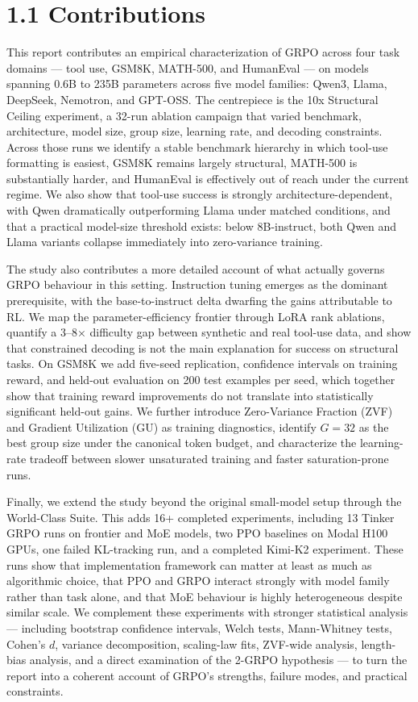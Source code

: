 \documentclass[
  american,
  11pt,
  a4paper,
  oneside]{report}
\begin{document}
\section{1.1 Contributions}\label{contributions}

This report contributes an empirical characterization of GRPO across
four task domains --- tool use, GSM8K, MATH-500, and HumanEval --- on
models spanning 0.6B to 235B parameters across five model families:
Qwen3, Llama, DeepSeek, Nemotron, and GPT-OSS. The centrepiece is the
10x Structural Ceiling experiment, a 32-run ablation campaign that
varied benchmark, architecture, model size, group size, learning rate,
and decoding constraints. Across those runs we identify a stable
benchmark hierarchy in which tool-use formatting is easiest, GSM8K
remains largely structural, MATH-500 is substantially harder, and
HumanEval is effectively out of reach under the current regime. We also
show that tool-use success is strongly architecture-dependent, with Qwen
dramatically outperforming Llama under matched conditions, and that a
practical model-size threshold exists: below 8B-instruct, both Qwen and
Llama variants collapse immediately into zero-variance training.

The study also contributes a more detailed account of what actually
governs GRPO behaviour in this setting. Instruction tuning emerges as
the dominant prerequisite, with the base-to-instruct delta dwarfing the
gains attributable to RL. We map the parameter-efficiency frontier
through LoRA rank ablations, quantify a 3--8× difficulty gap between
synthetic and real tool-use data, and show that constrained decoding is
not the main explanation for success on structural tasks. On GSM8K we
add five-seed replication, confidence intervals on training reward, and
held-out evaluation on 200 test examples per seed, which together show
that training reward improvements do not translate into statistically
significant held-out gains. We further introduce Zero-Variance Fraction
(ZVF) and Gradient Utilization (GU) as training diagnostics, identify
\(G{=}32\) as the best group size under the canonical token budget, and
characterize the learning-rate tradeoff between slower unsaturated
training and faster saturation-prone runs.

Finally, we extend the study beyond the original small-model setup
through the World-Class Suite. This adds 16+ completed experiments,
including 13 Tinker GRPO runs on frontier and MoE models, two PPO
baselines on Modal H100 GPUs, one failed KL-tracking run, and a
completed Kimi-K2 experiment. These runs show that implementation
framework can matter at least as much as algorithmic choice, that PPO
and GRPO interact strongly with model family rather than task alone, and
that MoE behaviour is highly heterogeneous despite similar scale. We
complement these experiments with stronger statistical analysis ---
including bootstrap confidence intervals, Welch tests, Mann-Whitney
tests, Cohen's \(d\), variance decomposition, scaling-law fits, ZVF-wide
analysis, length-bias analysis, and a direct examination of the 2-GRPO
hypothesis --- to turn the report into a coherent account of GRPO's
strengths, failure modes, and practical constraints.
\end{document}
